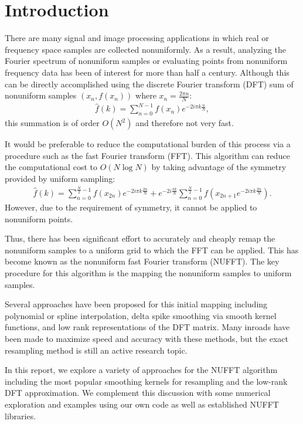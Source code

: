 \section{Introduction}

There are many signal and image processing applications in which real or frequency space samples are collected nonuniformly.
As a result, analyzing the Fourier spectrum of nonuniform samples or evaluating points from nonuniform frequency data has been of interest for more than half a century. %
Although this can be directly accomplished using the discrete Fourier transform (DFT) sum of nonuniform samples $(x_n, f(x_n))$ where $x_n = \frac{2\pi n}{N}$:
\begin{align*}
  \hat{f}(k) = \sum_{n=0}^{N-1} f(x_n) e^{-2i \pi k \frac{n}{N}}
,\end{align*}
this summation is of order $O(N^{2})$ and therefore not very fast.

It would be preferable to reduce the computational burden of this process via a procedure such as the fast Fourier transform (FFT).
This algorithm can reduce the computational cost to $O(N\log{N})$ by taking advantage of the symmetry provided by uniform sampling:
\begin{align*}
  \hat{f}(k) = \sum_{n=0}^{\frac{N}{2}-1} f(x_{2n})e^{-2i \pi k \frac{2n}{N}} + e^{-2i\frac{\pi k}{N}} \sum_{n=0}^{\frac{N}{2}-1} f(x_{2n+1}e^{-2i \pi k \frac{2n}{N}})
.\end{align*}
However, due to the requirement of symmetry, it cannot be applied to nonuniform points.

Thus, there has been significant effort to accurately and cheaply remap the nonuniform samples to a uniform grid to which the FFT can be applied.
This has become known as the nonuniform fast Fourier transform (NUFFT).
The key procedure for this algorithm is the mapping the nonuniform samples to uniform samples.

Several approaches have been proposed for this initial mapping including polynomial or spline interpolation, delta spike smoothing via smooth kernel functions, and low rank representations of the DFT matrix. %
Many inroads have been made to maximize speed and accuracy with these methods, but the exact resampling method is still an active research topic.

In this report, we explore a variety of approaches for the NUFFT algorithm including the most popular smoothing kernels for resampling and the low-rank DFT approximation.
We complement this discussion with some numerical exploration and examples using our own code as well as established NUFFT libraries.

